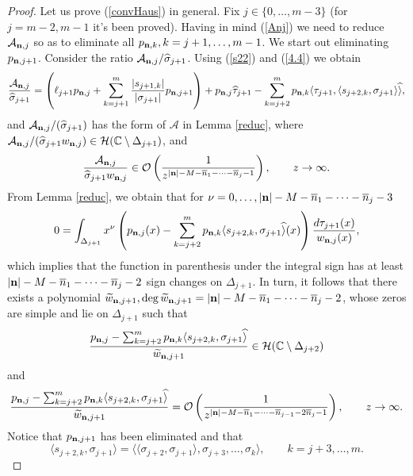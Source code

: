 \documentclass[10pt,a4paper]{article}
\theoremstyle{definition}
\theoremstyle{remark}
\numberwithin{equation}{section}
\begin{document}
\begin{proof}
Let us  prove (\ref{convHaus}) in general. Fix $j \in \{0,\ldots,m-3\}$ (for $j=m-2,m-1$ it's been proved). Having in mind (\ref{Anj}) we need to reduce $\mathcal{A}_{{\bf n},j}$ so as to eliminate all $p_{{\bf n},k}, k=j+1,\ldots,m-1$. We start out eliminating $p_{{\bf n},j+1}$. Consider the ratio $\mathcal{A}_{{\bf n},j}/\widehat{\sigma}_{j+1}$. Using (\ref{s22}) and (\ref{4.4}) we obtain
\[ \frac{\mathcal{A}_{{\bf n},j}}{\widehat{\sigma}_{j+1}} =    \left(\ell_{j+1} p_{{\bf n},j}+ \sum_{k=j+1}^m \frac{|s_{j+1,k}|}{|\sigma_{j+1}|} p_{{\bf n},j+1} \right) + p_{{\bf n},j}\widehat{\tau}_{j+1} - \sum_{k=j+2}^m p_{{\bf n},k} \langle  {\tau}_{j+1}, \langle s_{j+2,k}, \sigma_{j+1} \rangle \widehat{\rangle},
\]
and ${\mathcal{A}_{{\bf n},j}}/(\widehat{\sigma}_{j+1})$ has the form of $\mathcal{A}$ in Lemma \ref{reduc}, where $ {\mathcal{A}_{{\bf n},j}}/({\widehat{\sigma}_{j+1}w_{{\bf n},j}}) \in \mathcal{H}(\mathbb{C} \setminus \Delta_{j+1})$, and
\[\frac{\mathcal{A}_{{\bf n},j}}{\widehat{\sigma}_{j+1}w_{{\bf n},j}} \in \mathcal{O}\left(\frac{1}{z^{|{\bf n}| -M- \overline{n}_1 - \cdots-\overline{n}_{j} -1}}\right), \qquad z \to \infty.
\]
From  Lemma \ref{reduc}, we obtain that for $\nu = 0,\ldots,|{\bf n}| -M- \overline{n}_1 - \cdots-\overline{n}_{j} -3$
\[ 0 = \int_{\Delta_{j+1}} x^{\nu} \left( p_{{\bf n},j}(x) - \sum_{k=j+2}^m p_{{\bf n},k}  \langle s_{j+2,k}, \sigma_{j+1}  \widehat{\rangle}(x) \right)\frac{d\tau_{j+1}(x)}{w_{{\bf n},j}(x)},
\]
which implies that the function in parenthesis under the integral sign has at least $|{\bf n}|-M - \overline{n}_1 - \cdots-\overline{n}_{j} -2$ sign changes on $\Delta_{j+1}$. In turn, it follows that there exists  a polynomial $\widetilde{w}_{{\bf n},j+1}, \deg \widetilde{w}_{{\bf n},j+1} = |{\bf n}| -M- \overline{n}_1 - \cdots-\overline{n}_{j} -2$, whose zeros are simple and lie on $\Delta_{j+1}$ such that
\[ \frac{p_{{\bf n},j}  - \sum_{k=j+2}^m p_{{\bf n},k}  \langle s_{j+2,k}, \sigma_{j+1}  \widehat{\rangle} }{\widetilde{w}_{{\bf n},j+1}} \in \mathcal{H}(\mathbb{C} \setminus \Delta_{j+2})
\]
and
\[ \frac{p_{{\bf n},j}  - \sum_{k=j+2}^m p_{{\bf n},k}  \langle s_{j+2,k}, \sigma_{j+1}  \widehat{\rangle} }{\widetilde{w}_{{\bf n},j+1}} = \mathcal{O}\left(\frac{1}{z^{|{\bf n}|-M - \overline{n}_1 - \cdots-\overline{n}_{j-1}-2\overline{n}_{j} -1}}\right), \qquad z \to \infty.
\]
Notice that $p_{{\bf n},j+1}$ has been eliminated and that
\[ \langle s_{j+2,k}, \sigma_{j+1}   {\rangle} = \langle \langle \sigma_{j+2},\sigma_{j+1}\rangle, \sigma_{j+3}, \ldots,\sigma_k \rangle, \qquad k = j+3,\ldots,m.
\]


\end{proof}
\end{document}
